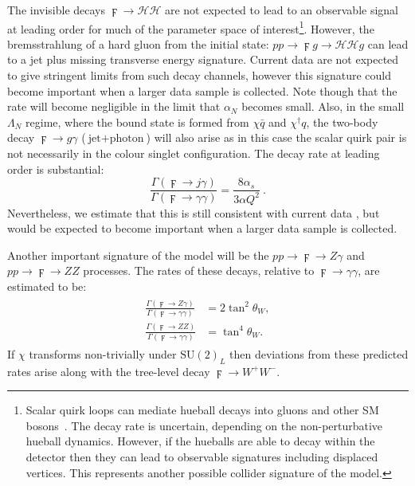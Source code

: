 The invisible decays $\digamma \rightarrow \mathcal{H} \mathcal{H}$ are not expected
to lead to an observable signal at leading order for much of the parameter space
of interest\footnote{Scalar quirk loops can mediate hueball decays into gluons
  and other SM bosons~\cite{Carlson:1991zn, Juknevich:2009ji, Juknevich:2009gg}. The decay
  rate is uncertain, depending on the non-perturbative hueball dynamics.
  However, if the hueballs are able to decay within the detector then they can
  lead to observable signatures including displaced vertices. This represents
  another possible collider signature of the model.}. However, the
bremsstrahlung of a hard gluon from the initial state:
$pp \rightarrow \digamma g \rightarrow \mathcal{H}\mathcal{H} g$ can lead to a jet
plus missing transverse energy signature. Current data are not expected to give
stringent limits from such decay channels, however this signature could become
important when a larger data sample is collected. Note though that the rate will
become negligible in the limit that $\alpha_{N}$ becomes small. Also, in the
small $\Lambda_{N}$ regime, where the bound state is formed from $\chi \bar{q}$
and $\chi^\dagger q$, the two-body decay $\digamma \rightarrow g \gamma$
($\text{jet} + \text{photon}$) will also arise as in this case the scalar quirk
pair is not necessarily in the colour singlet configuration. The decay rate at
leading order is substantial:
\begin{equation}
  \frac{\Gamma(\digamma \rightarrow j\gamma)}{\Gamma(\digamma \rightarrow \gamma \gamma)} = \frac{8\alpha_s}{3\alpha Q^2}\ .
\end{equation}
Nevertheless, we estimate that this is still consistent with current data
\cite{Aad:2015ywd}, but would be expected to become important when a larger data
sample is collected.

Another important signature of the model will be the $pp \rightarrow \digamma \rightarrow Z\gamma$
and $pp \rightarrow \digamma \rightarrow ZZ$ processes. The rates of these decays, relative to $\digamma
\rightarrow \gamma \gamma$, are estimated to be:
\begin{align}
  \begin{split}
    \frac{\Gamma (\digamma \rightarrow Z \gamma) }{\Gamma (\digamma \rightarrow \gamma \gamma)} &= 2 \tan^2 \theta_{W},\\
    \frac{\Gamma (\digamma \rightarrow Z Z) }{\Gamma (\digamma \rightarrow \gamma \gamma)} &= \tan^4 \theta_{W}.
  \end{split}
\end{align}
If $\chi$ transforms non-trivially under $\mathrm{SU}(2)_{L}$ then deviations
from these predicted rates arise along with the tree-level decay
$\digamma \rightarrow W^+ W^-$.

